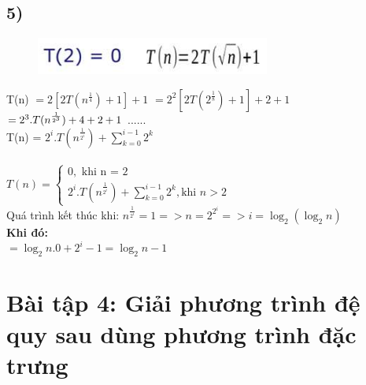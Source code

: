 \documentclass[10pt,a4paper]{article}
\begin{document}
\subsection*{5)}
\begin{figure}[H]
    \centering
    \includegraphics[scale=.7]{images/35.png}
    \label{fig:my_label}
\end{figure}
T(n) 
$=2[2T(n^{\frac{1}{4}}) + 1] + 1$ $=2^2[2T(2^{\frac{1}{8}})+1] + 2 + 1$ $= 2^3.T(n^{\frac{1}{2^3}}) + 4 + 2 + 1\\$
......\\
T(n) = $2^i.T(n^{\frac{1}{2^i}}) + \sum_{k=0}^{i-1}2^k$ \\ \\
$
T(n) = 
    \begin{cases}
        0, \text{ khi n = 2} \\
        2^i.T(n^{\frac{1}{2^i}}) + \sum_{k=0}^{i-1}2^k , \text{khi $n>2$}
    \end{cases}
$
\\
Quá trình kết thúc khi: $n^{\frac{1}{2^i}} = 1 => n = 2^{2^i} => i = \log_{2}(\log_{2}n)$ \\
\textbf{Khi đó:}
\\
$= \log_{2}n.0 + 2^i-1 = \log_{2}n -1$ 
\section*{Bài tập 4: Giải phương trình đệ quy sau dùng phương trình đặc trưng} 
\end{document}
